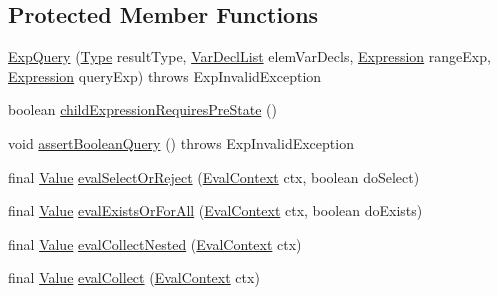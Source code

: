 \subsection*{Protected Member Functions}
\begin{DoxyCompactItemize}
\item 
\hyperlink{classorg_1_1tzi_1_1use_1_1uml_1_1ocl_1_1expr_1_1_exp_query_a01cdecfd164f7a69130b3abbc025e2ea}{Exp\-Query} (\hyperlink{interfaceorg_1_1tzi_1_1use_1_1uml_1_1ocl_1_1type_1_1_type}{Type} result\-Type, \hyperlink{classorg_1_1tzi_1_1use_1_1uml_1_1ocl_1_1expr_1_1_var_decl_list}{Var\-Decl\-List} elem\-Var\-Decls, \hyperlink{classorg_1_1tzi_1_1use_1_1uml_1_1ocl_1_1expr_1_1_expression}{Expression} range\-Exp, \hyperlink{classorg_1_1tzi_1_1use_1_1uml_1_1ocl_1_1expr_1_1_expression}{Expression} query\-Exp)  throws Exp\-Invalid\-Exception 
\item 
boolean \hyperlink{classorg_1_1tzi_1_1use_1_1uml_1_1ocl_1_1expr_1_1_exp_query_ab330ba12b0b9e7de85f7745172198cbe}{child\-Expression\-Requires\-Pre\-State} ()
\item 
void \hyperlink{classorg_1_1tzi_1_1use_1_1uml_1_1ocl_1_1expr_1_1_exp_query_a6661d84573da86756cc212ff6a00ee14}{assert\-Boolean\-Query} ()  throws Exp\-Invalid\-Exception 
\item 
final \hyperlink{classorg_1_1tzi_1_1use_1_1uml_1_1ocl_1_1value_1_1_value}{Value} \hyperlink{classorg_1_1tzi_1_1use_1_1uml_1_1ocl_1_1expr_1_1_exp_query_a2666872eca7df4760fec0d9694cf8898}{eval\-Select\-Or\-Reject} (\hyperlink{classorg_1_1tzi_1_1use_1_1uml_1_1ocl_1_1expr_1_1_eval_context}{Eval\-Context} ctx, boolean do\-Select)
\item 
final \hyperlink{classorg_1_1tzi_1_1use_1_1uml_1_1ocl_1_1value_1_1_value}{Value} \hyperlink{classorg_1_1tzi_1_1use_1_1uml_1_1ocl_1_1expr_1_1_exp_query_a24a1116c552b98064461c4cfcf1945a4}{eval\-Exists\-Or\-For\-All} (\hyperlink{classorg_1_1tzi_1_1use_1_1uml_1_1ocl_1_1expr_1_1_eval_context}{Eval\-Context} ctx, boolean do\-Exists)
\item 
final \hyperlink{classorg_1_1tzi_1_1use_1_1uml_1_1ocl_1_1value_1_1_value}{Value} \hyperlink{classorg_1_1tzi_1_1use_1_1uml_1_1ocl_1_1expr_1_1_exp_query_a6ec9c8ae4ba5a06558c4acca93109c55}{eval\-Collect\-Nested} (\hyperlink{classorg_1_1tzi_1_1use_1_1uml_1_1ocl_1_1expr_1_1_eval_context}{Eval\-Context} ctx)
\item 
final \hyperlink{classorg_1_1tzi_1_1use_1_1uml_1_1ocl_1_1value_1_1_value}{Value} \hyperlink{classorg_1_1tzi_1_1use_1_1uml_1_1ocl_1_1expr_1_1_exp_query_aec317e1342ceea7ded13a1e853c2936f}{eval\-Collect} (\hyperlink{classorg_1_1tzi_1_1use_1_1uml_1_1ocl_1_1expr_1_1_eval_context}{Eval\-Context} ctx)

\end{DoxyCompactItemize}
